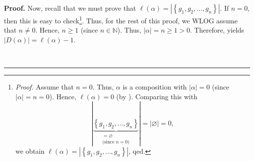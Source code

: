 \documentclass[numbers=enddot,12pt,final,onecolumn,notitlepage]{scrartcl}%
\theoremstyle{definition}
\newenvironment{proof}[1][Proof]{\noindent\textbf{#1.} }{\ \rule{0.5em}{0.5em}}
\newenvironment{verlong}{}{}
\begin{document}
\begin{verlong}
\begin{proof}
Now, recall that we must prove that $\ell\left(  \alpha\right)  =\left\vert
\left\{  g_{1},g_{2},\ldots,g_{n}\right\}  \right\vert $. If $n=0$, then this
is easy to check\footnote{\textit{Proof.} Assume that $n=0$. Thus, $\alpha$ is
a composition with $\left\vert \alpha\right\vert =0$ (since $\left\vert
\alpha\right\vert =n=0$). Hence, $\ell\left(  \alpha\right)  =0$ (by
\cite[Proposition 2.4]{comps}). Comparing this with
\[
\left\vert \underbrace{\left\{  g_{1},g_{2},\ldots,g_{n}\right\}
}_{\substack{=\varnothing\\\text{(since }n=0\text{)}}}\right\vert =\left\vert
\varnothing\right\vert =0,
\]
we obtain $\ell\left(  \alpha\right)  =\left\vert \left\{  g_{1},g_{2}%
,\ldots,g_{n}\right\}  \right\vert $, qed.}. Thus, for the rest of this proof,
we WLOG assume that $n\neq0$. Hence, $n\geq1$ (since $n\in\mathbb{N}$). Thus,
$\left\vert \alpha\right\vert =n\geq1>0$. Therefore, \cite[Proposition
2.3]{comps} yields $\left\vert D\left(  \alpha\right)  \right\vert
=\ell\left(  \alpha\right)  -1$.


\end{proof}
\end{verlong}
\end{document}

